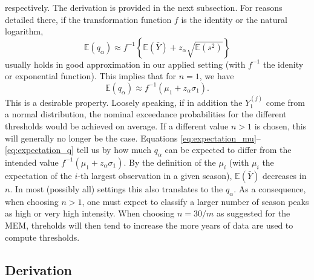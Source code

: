 \documentclass{article}
\newcommand{\sd}{s}
\newcommand{\mean}{\bar{Y}}
\begin{document}
respectively. The derivation is provided in the next subsection. For reasons detailed there, if the transformation function $f$ is the identity or the natural logarithm,
\begin{equation}
\mathbb{E}(q_\alpha) \approx f^{-1}\left\{\mathbb{E}(\mean) + z_\alpha \sqrt{\mathbb{E}(\sd^2)}\right\}
\label{eq:expectation_q}
\end{equation}
usually holds in good approximation in our applied setting (with $f^{-1}$ the idenity or exponential function). This implies that for $n = 1$, we have
$$
\mathbb{E}(q_\alpha) \approx f^{-1}(\mu_1 + z_\alpha \sigma_1).
$$
This is a desirable property. Loosely speaking, if in addition the $Y_{1}^{(j)}$ come from a normal distribution, the nominal exceedance probabilities for the different thresholds would be achieved on average. If a different value $n > 1$ is chosen, this will generally no longer be the case. Equations \eqref{eq:expectation_mu}--\eqref{eq:expectation_q} tell us by how much $q_\alpha$ can be expected to differ from the intended value $f^{-1}(\mu_1 + z_\alpha \sigma_1)$. By the definition of the $\mu_i$ (with $\mu_i$ the expectation of the $i$-th largest observation in a given season), $\mathbb{E}(\mean)$ decreases in $n$. In most (possibly all) settings this also translates to the $q_\alpha$. As a consequence, when choosing $n > 1$, one must expect to classify a larger number of season peaks as high or very high intensity. When choosing $n = 30/m$ as suggested for the MEM, threholds will then tend to increase the more years of data are used to compute thresholds.

\subsection{Derivation}
\end{document}
